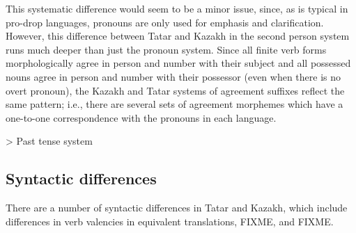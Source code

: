 \documentclass[11pt]{article}
\begin{document}
This systematic difference would seem to be a minor issue, since, as is typical in pro-drop languages, pronouns are only used for emphasis and clarification.  However, this difference between Tatar and Kazakh in the second person system runs much deeper than just the pronoun system.  Since all finite verb forms morphologically agree in person and number with their subject and all possessed nouns agree in person and number with their possessor (even when there is no overt pronoun), the Kazakh and Tatar systems of agreement suffixes reflect the same pattern; i.e., there are several sets of agreement morphemes which have a one-to-one correspondence with the pronouns in each language.

> Past tense system

%

%

\subsection{Syntactic differences}

There are a number of syntactic differences in Tatar and Kazakh, which include differences in verb valencies in equivalent translations, FIXME, and FIXME.
\end{document}
